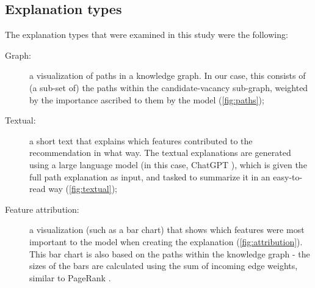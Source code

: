 \subsection{Explanation types}
\label{sec:explanation_types}
The explanation types that were examined in this study were the following:

\begin{description}
    \item[Graph:] a visualization of paths in a knowledge graph. In our case, this consists of (a sub-set of) the paths within the candidate-vacancy sub-graph, weighted by the importance ascribed to them by the model (\cref{fig:paths});
    \item[Textual:] a short text that explains which features contributed to the recommendation in what way. The textual explanations are generated using a large language model (in this case, ChatGPT \cite{openai2022chatgpt}), which is given the full path explanation as input, and tasked to summarize it in an easy-to-read way (\cref{fig:textual}); 
    \item[Feature attribution:] a visualization (such as a bar chart) that shows which features were most important to the model when creating the explanation (\cref{fig:attribution}). This bar chart is also based on the paths within the knowledge graph - the sizes of the bars are calculated using the sum of incoming edge weights, similar to PageRank \cite{bianchini2005inside}.
\end{description}

